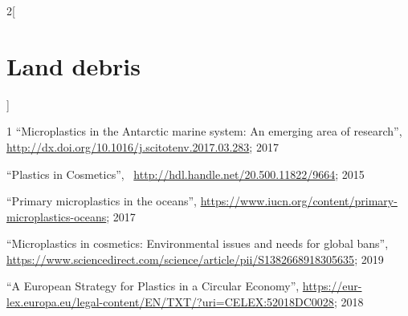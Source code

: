 \documentclass{article}
\begin{document}
\begin{multicols}{2}[
    \section{Land debris}
]
\end{multicols}

\begin{thebibliography}{1}
        ``Microplastics in the Antarctic marine system: An emerging area of research'',
        \url{http://dx.doi.org/10.1016/j.scitotenv.2017.03.283}; 2017

        ``Plastics in Cosmetics'', \
        \url{http://hdl.handle.net/20.500.11822/9664}; 2015

        ``Primary microplastics in the oceans'', 
        \url{https://www.iucn.org/content/primary-microplastics-oceans}; 2017

        ``Microplastics in cosmetics: Environmental issues and needs for global bans'', 
        \url{https://www.sciencedirect.com/science/article/pii/S1382668918305635}; 2019

        ``A European Strategy for Plastics in a Circular Economy'', 
        \url{https://eur-lex.europa.eu/legal-content/EN/TXT/?uri=CELEX:52018DC0028}; 2018
\end{thebibliography}
\end{document}
